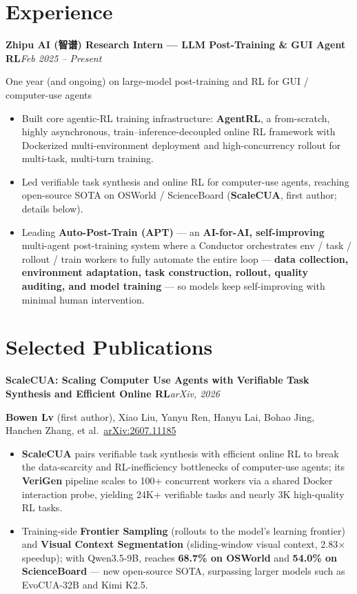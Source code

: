 \documentclass[10pt,a4paper]{article}
\newcommand{\entry}[2]{%
  \par\vspace{1pt}%
  {\sffamily\bfseries\color{inkc}#1}\hfill{\small\itshape\color{mutedc}#2}\par
  \vspace{0.5pt}}
\newcommand{\role}[1]{{\small\color{accentd}\sffamily #1}\par\vspace{1pt}}
\begin{document}
\section{Experience}
\entry{Zhipu AI (智谱) \quad Research Intern --- LLM Post-Training \& GUI Agent RL}{Feb 2025 -- Present}
\role{One year (and ongoing) on large-model post-training and RL for GUI / computer-use agents}
\begin{itemize}
  \item Built core agentic-RL training infrastructure: \textbf{AgentRL}, a from-scratch, highly asynchronous, train--inference-decoupled online RL framework with Dockerized multi-environment deployment and high-concurrency rollout for multi-task, multi-turn training.
  \item Led verifiable task synthesis and online RL for computer-use agents, reaching open-source SOTA on OSWorld / ScienceBoard (\textbf{ScaleCUA}, first author; details below).
  \item Leading \textbf{Auto-Post-Train (APT)} --- an \textbf{AI-for-AI, self-improving} multi-agent post-training system where a Conductor orchestrates env / task / rollout / train workers to fully automate the entire loop --- \textbf{data collection, environment adaptation, task construction, rollout, quality auditing, and model training} --- so models keep self-improving with minimal human intervention.
\end{itemize}

\section{Selected Publications}
\entry{ScaleCUA: Scaling Computer Use Agents with Verifiable Task Synthesis and Efficient Online RL}{arXiv, 2026}
\role{\textbf{Bowen Lv} (first author), Xiao Liu, Yanyu Ren, Hanyu Lai, Bohao Jing, Hanchen Zhang, et al.\quad\faExternalLink*~\href{https://arxiv.org/abs/2607.11185}{arXiv:2607.11185}}
\begin{itemize}
  \item \textbf{ScaleCUA} pairs verifiable task synthesis with efficient online RL to break the data-scarcity and RL-inefficiency bottlenecks of computer-use agents; its \textbf{VeriGen} pipeline scales to 100+ concurrent workers via a shared Docker interaction probe, yielding 24K+ verifiable tasks and nearly 3K high-quality RL tasks.
  \item Training-side \textbf{Frontier Sampling} (rollouts to the model's learning frontier) and \textbf{Visual Context Segmentation} (sliding-window visual context, 2.83$\times$ speedup); with Qwen3.5-9B, reaches \textbf{68.7\% on OSWorld} and \textbf{54.0\% on ScienceBoard} --- new open-source SOTA, surpassing larger models such as EvoCUA-32B and Kimi K2.5.
\end{itemize}
\end{document}
